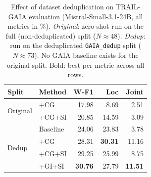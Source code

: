 \begin{table}[t]
\centering
\small
\setlength{\tabcolsep}{6pt}
\renewcommand{\arraystretch}{1.2}
\begin{tabular}{l l rrr}
\toprule
\textbf{Split} & \textbf{Method} & \textbf{W-F1} & \textbf{Loc} & \textbf{Joint} \\
\midrule
\multirow{2}{*}{Original}
  & +CG      & 17.98 &  8.69 &  2.51 \\
  & +CG+SI   & 20.85 & 14.59 &  3.09 \\
\midrule
\multirow{4}{*}{Dedup}
  & Baseline & 24.06 & 23.83 &  3.78 \\
  & +CG      & 28.31 & \textbf{30.31} & 11.16 \\
  & +CG+SI   & 29.25 & 25.99 &  8.75 \\
  & +GI+SI   & \textbf{30.76} & 27.79 & \textbf{11.51} \\
\bottomrule
\end{tabular}
\caption{%
  Effect of dataset deduplication on TRAIL-GAIA evaluation
  (Mistral-Small-3.1-24B, all metrics in \%).
  \textit{Original}: zero-shot run on the full (non-deduplicated) split ($N{\approx}48$).
  \textit{Dedup}: run on the deduplicated \texttt{GAIA\_dedup} split ($N{\approx}73$).
  No GAIA baseline exists for the original split.
  Bold: best per metric across all rows.%
}
\label{tab:ablation_dedup_baseline}
\end{table}



